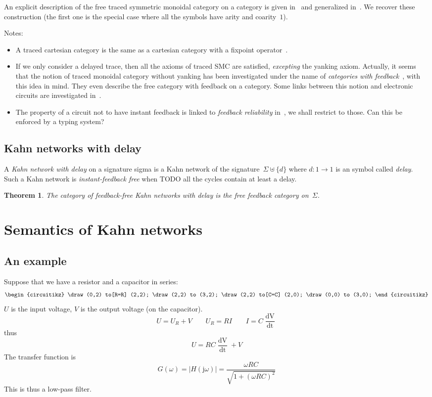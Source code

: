\documentclass{article}
\newtheorem{theorem}{Theorem}
\newcommand{\cj}{\mathrm{j}}
\newcommand{\dd}[1]{\mathop{\mathrm{d}#1}}
\begin{document}
An explicit description of the free traced symmetric monoidal category on a
category is given in~\cite{abramsky:traced-compact-closed} and generalized
in~\cite{hasegawa2008finite}. We recover these construction (the first one is
the special case where all the symbols have arity and coarity~$1$).

Notes:
\begin{itemize}
\item A traced cartesian category is the same as a cartesian category with a
  fixpoint operator~\cite{hasegawa1997recursion}.
\item If we only consider a delayed trace, then all the axioms of traced SMC are
  satisfied, \emph{excepting} the yanking axiom. Actually, it seems that the
  notion of traced monoidal category without yanking has been investigated under
  the name of \emph{categories with feedback}~\cite{katis2002feedback}, with
  this idea in mind. They even describe the free category with feedback on a
  category. Some links between this notion and electronic circuits are
  investigated in~\cite{katis1999algebra}.
\item The property of a circuit not to have instant feedback is linked to
  \emph{feedback reliability} in~\cite{pardo2004synchronous}, we shall restrict
  to those. Can this be enforced by a typing system?
\end{itemize}

\subsection{Kahn networks with delay}
A \emph{Kahn network with delay} on a signature sigma is a Kahn network of the
signature~$\Sigma\uplus\{d\}$ where $d:1\to 1$ is an symbol called
\emph{delay}. Such a Kahn network is \emph{instant-feedback free} when TODO all
the cycles contain at least a delay.

\begin{theorem}
  The category of feedback-free Kahn networks with delay is the free feedback
  category on~$\Sigma$.
\end{theorem}


\section{Semantics of Kahn networks}
\subsection{An example}
Suppose that we have a resistor and a capacitor in series:
\[
\begin{circuitikz}
  \draw (0,2) to[R=R] (2,2);
  \draw (2,2) to (3,2);
  \draw (2,2) to[C=C] (2,0);
  \draw (0,0) to (3,0);
\end{circuitikz}
\]
$U$ is the input voltage, $V$ is the output voltage (on the capacitor).
\[
U=U_R+V
\qquad
U_R=RI
\qquad
I=C\frac{\dd V}{\dd t}
\]
thus
\[
U=RC\frac{\dd V}{\dd t}+V
\]
The transfer function is
\[
G(\omega)=|H(\cj\omega)|=\frac{\omega RC}{\sqrt{1+(\omega RC)^2}}
\]
This is thus a low-pass filter.
\end{document}
